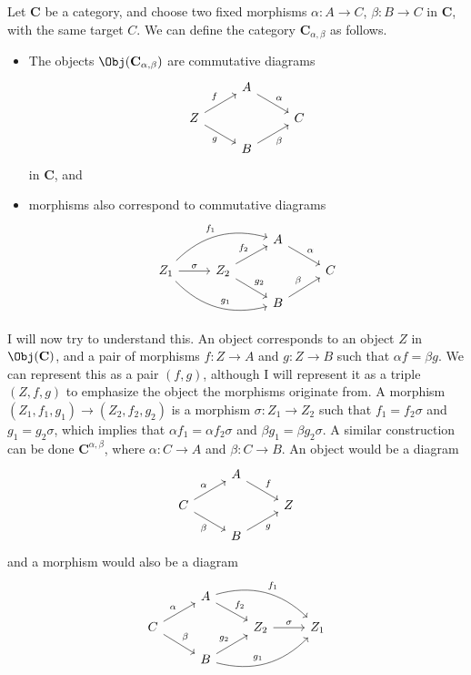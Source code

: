 Let $\mathbf{C}$ be a category, and choose two fixed morphisms $\alpha : A \to C$, $\beta : B \to C$ in $\mathbf{C}$, with the same target $C$. We can define the category $\mathbf{C}_{\alpha ,\beta }$ as follows.
\begin{itemize}
	\item The objects $\Obj( \mathbf{C}_{\alpha ,\beta } ) $ are commutative diagrams
		\[\begin{tikzcd}[row sep=1em, column sep=2.5em]
			&A\arrow[dr, "\alpha "]\\
			Z\arrow[ur, "f"]\arrow[dr,"g"']&&C\\
					&B\arrow[ur,"\beta "']
		\end{tikzcd}\]
		in $\mathbf{C}$, and
	\item morphisms also correspond to commutative diagrams
		\[\begin{tikzcd}[row sep=1em, column sep=2.5em]
			&&A\arrow[dr,"\alpha "]\\
			Z_1 \arrow[urr, bend left, "f_1"]\arrow[r, "\sigma "]\arrow[drr, bend right, "g_1"]&Z_2\arrow[ur,"f_2"]\arrow[dr,"g_2"]&&C\\
													     &&B\arrow[ur,"\beta "]
		\end{tikzcd}\]
		
\end{itemize}
I will now try to understand this. An object corresponds to an object $Z$ in $\Obj( \mathbf{C} ) $, and a pair of morphisms $f : Z \to A$ and $g : Z \to B$ such that $\alpha f=\beta g$. We can represent this as a pair $(f,g)$, although I will represent it as a triple $(Z,f,g)$ to emphasize the object the morphisms originate from. A morphism $(Z_1,f_1,g_1)\to (Z_2,f_2,g_2)$ is a morphism $\sigma : Z_1 \to Z_2$ such that $f_1=f_2\sigma $ and $g_1=g_2\sigma $, which implies that $\alpha f_1=\alpha f_2\sigma $ and $\beta g_1=\beta g_2\sigma $. A similar construction can be done $\mathbf{C}^{\alpha ,\beta }$, where $\alpha : C \to A$ and $\beta : C \to B$. An object would be a diagram
		\[\begin{tikzcd}[row sep=1em, column sep=2.5em]
			&A\arrow[dr, "f "]\\
			C\arrow[ur, "\alpha "]\arrow[dr,"\beta "']&&Z\\
					&B\arrow[ur,"g "']
		\end{tikzcd}\]
and a morphism would also be a diagram
\[\begin{tikzcd}[row sep=1em, column sep=2.5em]
	&A\arrow[dr,"f_2"]\arrow[drr,bend left,"f_1"]\\
	C\arrow[ur,"\alpha "]\arrow[dr,"\beta "]&&Z_2\arrow[r,"\sigma "]&Z_1\\
						&B\arrow[ur,"g_2"]\arrow[urr,bend right,"g_1"]
\end{tikzcd}\]
